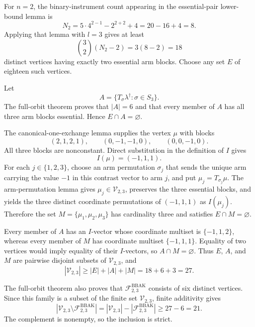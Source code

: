 For \(n=2\), the binary-instrument count appearing in the essential-pair lower-bound lemma is
\[N_2=5\cdot4^{2-1}-2^{2+2}+4=20-16+4=8.\]
Applying that lemma with \(l=3\) gives at least
\[\binom{3}{2}(N_2-2)=3(8-2)=18\]
distinct vertices having exactly two essential arm blocks. Choose any set \(E\) of eighteen such vertices.

Let
\[A=\{T_\sigma\lambda^\dagger:\sigma\in S_3\}.\]
The full-orbit theorem proves that \(|A|=6\) and that every member of \(A\) has all three arm blocks essential. Hence \(E\cap A=\varnothing\).

The canonical-one-exchange lemma supplies the vertex \(\mu\) with blocks
\[(2,1,2,1),\qquad(0,-1,-1,0),\qquad(0,0,-1,0).\]
All three blocks are nonconstant. Direct substitution in the definition of \(I\) gives
\[I(\mu)=(-1,1,1).\]
For each \(j\in\{1,2,3\}\), choose an arm permutation \(\sigma_j\) that sends the unique arm carrying the value \(-1\) in this contrast vector to arm \(j\), and put \(\mu_j=T_{\sigma_j}\mu\). The arm-permutation lemma gives \(\mu_j\in\mathcal V_{2,3}\), preserves the three essential blocks, and yields the three distinct coordinate permutations of \((-1,1,1)\) as \(I(\mu_j)\). Therefore the set \(M=\{\mu_1,\mu_2,\mu_3\}\) has cardinality three and satisfies \(E\cap M=\varnothing\).

Every member of \(A\) has an \(I\)-vector whose coordinate multiset is \(\{-1,1,2\}\), whereas every member of \(M\) has coordinate multiset \(\{-1,1,1\}\). Equality of two vertices would imply equality of their \(I\)-vectors, so \(A\cap M=\varnothing\). Thus \(E\), \(A\), and \(M\) are pairwise disjoint subsets of \(\mathcal V_{2,3}\), and
\[|\mathcal V_{2,3}|\ge |E|+|A|+|M|=18+6+3=27.\]

The full-orbit theorem also proves that \(\mathcal F^{\mathrm{BBAK}}_{2,3}\) consists of six distinct vertices. Since this family is a subset of the finite set \(\mathcal V_{2,3}\), finite additivity gives
\[|\mathcal V_{2,3}\setminus\mathcal F^{\mathrm{BBAK}}_{2,3}|=|\mathcal V_{2,3}|-|\mathcal F^{\mathrm{BBAK}}_{2,3}|\ge27-6=21.\]
The complement is nonempty, so the inclusion is strict.